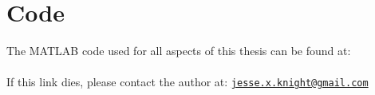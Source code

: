 \chapter{Code}
The MATLAB code used for all aspects of this thesis can be found at:\\
\\
If this link dies, please contact the author at:
\href{mailto:jesse.x.knight@gmail.com}{\footnotesize{\texttt{jesse.x.knight@gmail.com}}}\\
